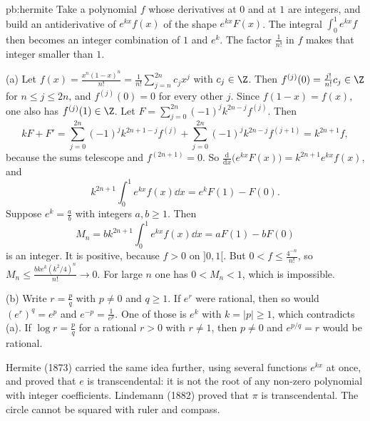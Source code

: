 \begin{solution}{pb:hermite}
\idea Take a polynomial $f$ whose derivatives at $0$ and at $1$ are integers, and build an antiderivative of $e^{kx}f(x)$ of the shape $e^{kx}F(x)$.
The integral $\int_0^1e^{kx}f$ then becomes an integer combination of $1$ and $e^k$. The factor $\frac1{n!}$ in $f$ makes that integer smaller than $1$.

\writeup (a) Let $f(x)=\frac{x^n(1-x)^n}{n!}=\frac1{n!}\sum_{j=n}^{2n}c_jx^j$ with $c_j\in\Z$. Then $f^{(j)}(0)=\frac{j!}{n!}c_j\in\Z$ for $n\le j\le2n$, and $f^{(j)}(0)=0$ for
every other $j$. Since $f(1-x)=f(x)$, one also has $f^{(j)}(1)\in\Z$. Let $F=\sum_{j=0}^{2n}(-1)^jk^{2n-j}f^{(j)}$. Then
\[
kF+F'=\sum_{j=0}^{2n}(-1)^jk^{2n+1-j}f^{(j)}+\sum_{j=0}^{2n}(-1)^jk^{2n-j}f^{(j+1)}=k^{2n+1}f,
\]
because the sums telescope and $f^{(2n+1)}=0$. So $\frac{\mathrm d}{\mathrm dx}\bigl(e^{kx}F(x)\bigr)=k^{2n+1}e^{kx}f(x)$, and
\[
k^{2n+1}\int_0^1e^{kx}f(x)\dd x=e^kF(1)-F(0).
\]
Suppose $e^k=\frac ab$ with integers $a,b\ge1$. Then
\[
M_n=bk^{2n+1}\int_0^1e^{kx}f(x)\dd x=aF(1)-bF(0)
\]
is an integer. It is positive, because
$f>0$ on $]0,1[$. But $0<f\le\frac{4^{-n}}{n!}$, so $M_n\le\frac{bk e^k(k^2/4)^n}{n!}\to0$. For large $n$ one has $0<M_n<1$, which is impossible.

(b) Write $r=\frac pq$ with $p\ne0$ and $q\ge1$. If $e^r$ were rational, then so would $(e^r)^q=e^p$ and $e^{-p}=\frac1{e^p}$. One of those is $e^k$
with $k=|p|\ge1$, which contradicts (a). If $\log r=\frac pq$ for a rational $r>0$ with $r\ne1$, then $p\ne0$ and $e^{p/q}=r$ would be
rational.

\leads Hermite (1873) carried the same idea further, using several functions $e^{kx}$ at once, and proved that $e$ is transcendental: it is not the root of
any non-zero polynomial with integer coefficients. Lindemann (1882) proved that $\pi$ is transcendental. The circle
cannot be squared with ruler and compass.
\end{solution}

